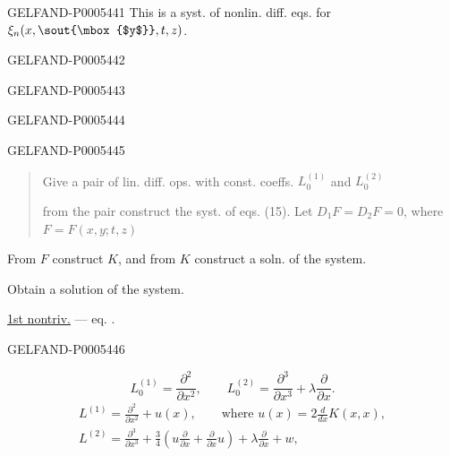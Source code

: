 \begin{GelfandAdjacentEvidence}{GELFAND-P000544}{1}
This is a syst. of nonlin. diff. eqs. for \(\xi_n(x,\text{\sout{\mbox{$y$}}},t,z)\).
\end{GelfandAdjacentEvidence}
\begin{GelfandAdjacentEvidence}{GELFAND-P000544}{2}

\end{GelfandAdjacentEvidence}
\begin{GelfandAdjacentEvidence}{GELFAND-P000544}{3}


\qquad
{}
\end{GelfandAdjacentEvidence}
\begin{GelfandAdjacentEvidence}{GELFAND-P000544}{4}

\end{GelfandAdjacentEvidence}
\begin{GelfandAdjacentEvidence}{GELFAND-P000544}{5}


\begin{quote}
Give a pair of lin. diff. ops. with const. coeffs. \(L_0^{(1)}\) and \(L_0^{(2)}\)

from the pair construct the syst. of eqs. (15). Let \(D_1F=D_2F=0\),
where \(F=F(x,y;t,z)\)
\end{quote}
From \(F\) construct \(K\), and from \(K\) construct a soln. of the system.

Obtain a solution of the system.

\uline{1st nontriv.} — eq. .
\end{GelfandAdjacentEvidence}
\begin{GelfandAdjacentEvidence}{GELFAND-P000544}{6}

\[
L_0^{(1)}=\frac{\partial^2}{\partial x^2},\qquad
L_0^{(2)}=\frac{\partial^3}{\partial x^3}+\lambda\frac{\partial}{\partial x}.
\]
\begin{gather*}
L^{(1)}=\frac{\partial^2}{\partial x^2}+u(x),\qquad
\text{where } u(x)=2\frac d{dx}K(x,x),\\
L^{(2)}=\frac{\partial^3}{\partial x^3}
+\frac34\left(u\frac{\partial}{\partial x}+\frac{\partial}{\partial x}u\right)
+\lambda\frac{\partial}{\partial x}+w,
\end{gather*}
\end{GelfandAdjacentEvidence}
